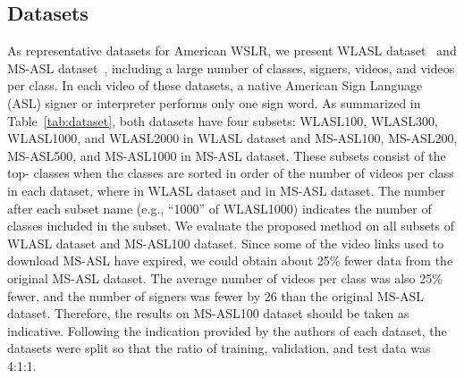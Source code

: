 \documentclass[journal]{IEEEtran}
\begin{document}
\subsection{Datasets}
As representative datasets for American WSLR, we present WLASL dataset~\cite{li2020word} and MS-ASL dataset~\cite{vaezi2019ms-asl}, including a large number of classes, signers, videos, and videos per class. In each video of these datasets, a native American Sign Language (ASL) signer or interpreter performs only one sign word.
As summarized in Table~\ref{tab:dataset}, both datasets have four subsets: WLASL100, WLASL300, WLASL1000, and WLASL2000 in WLASL dataset and MS-ASL100, MS-ASL200, MS-ASL500, and MS-ASL1000 in MS-ASL dataset.
These subsets consist of the top- classes when the classes are sorted in order of the number of videos per class in each dataset, where  in WLASL dataset and  in MS-ASL dataset.
The number after each subset name (e.g., ``1000'' of WLASL1000) indicates the number of classes included in the subset.
We evaluate the proposed method on all subsets of WLASL dataset and MS-ASL100 dataset.
Since some of the video links used to download MS-ASL have expired, we could obtain about 25\% fewer data from the original MS-ASL dataset. The average number of videos per class was also 25\% fewer, and the number of signers was fewer by 26 than the original MS-ASL dataset.
Therefore, the results on MS-ASL100 dataset should be taken as indicative.
Following the indication provided by the authors of each dataset, the datasets were split so that the ratio of training, validation, and test data was 4:1:1.
\end{document}
